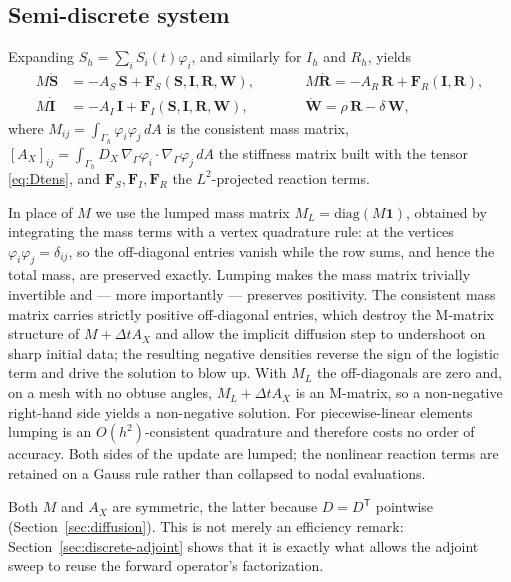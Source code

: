 \documentclass[11pt]{article}
\newcommand{\Grad}{\nabla_\Gamma}
\begin{document}
\subsection{Semi-discrete system}

Expanding $S_h = \sum_i S_i(t)\varphi_i$, and similarly for $I_h$ and $R_h$, yields
\begin{align}
M\dot{\mathbf{S}} &= -A_S\,\mathbf{S} + \mathbf{F}_S(\mathbf{S},\mathbf{I},\mathbf{R},\mathbf{W}), \qquad
&&M\dot{\mathbf{R}} = -A_R\,\mathbf{R} + \mathbf{F}_R(\mathbf{I},\mathbf{R}), \\
M\dot{\mathbf{I}} &= -A_I\,\mathbf{I} + \mathbf{F}_I(\mathbf{S},\mathbf{I},\mathbf{R},\mathbf{W}), \qquad
&&\dot{\mathbf{W}} = \rho\,\mathbf{R} - \delta\,\mathbf{W},
\end{align}
where $M_{ij} = \int_{\Gamma_h}\varphi_i\varphi_j\,dA$ is the consistent mass matrix, $[A_X]_{ij} = \int_{\Gamma_h} D_X\,\Grad\varphi_i\cdot\Grad\varphi_j\,dA$ the stiffness matrix built with the tensor \eqref{eq:Dtens}, and $\mathbf{F}_S,\mathbf{F}_I,\mathbf{F}_R$ the $L^2$-projected reaction terms.

In place of $M$ we use the lumped mass matrix $M_L = \mathrm{diag}(M\mathbf{1})$, obtained by integrating the mass terms with a vertex quadrature rule: at the vertices $\varphi_i\varphi_j = \delta_{ij}$, so the off-diagonal entries vanish while the row sums, and hence the total mass, are preserved exactly. Lumping makes the mass matrix trivially invertible and --- more importantly --- preserves positivity. The consistent mass matrix carries strictly positive off-diagonal entries, which destroy the M-matrix structure of $M+\Delta t A_X$ and allow the implicit diffusion step to undershoot on sharp initial data; the resulting negative densities reverse the sign of the logistic term and drive the solution to blow up. With $M_L$ the off-diagonals are zero and, on a mesh with no obtuse angles, $M_L + \Delta t A_X$ is an M-matrix, so a non-negative right-hand side yields a non-negative solution. For piecewise-linear elements lumping is an $O(h^2)$-consistent quadrature and therefore costs no order of accuracy. Both sides of the update are lumped; the nonlinear reaction terms are retained on a Gauss rule rather than collapsed to nodal evaluations.

Both $M$ and $A_X$ are symmetric, the latter because $D=D^{\mathsf T}$ pointwise (Section~\ref{sec:diffusion}). This is not merely an efficiency remark: Section~\ref{sec:discrete-adjoint} shows that it is exactly what allows the adjoint sweep to reuse the forward operator's factorization.
\end{document}
